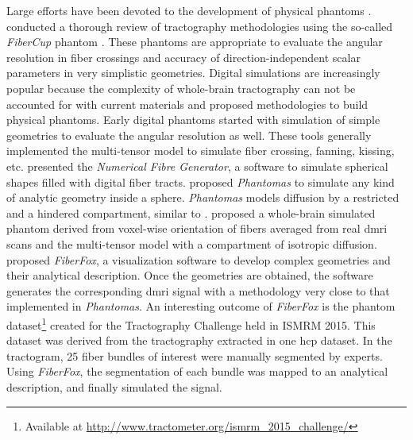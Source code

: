 \documentclass[english]{frontiers/frontiersSCNS} %
\begin{document}
Large efforts have been devoted to the development of physical phantoms
  \citep{lin_validation_2001,campbell_flowbased_2005,perrin_validation_2005,fieremans_simulation_2008,tournier_resolving_2008}.
\cite{cote_tractometer_2013} conducted a thorough review of tractography methodologies using the
  so-called \emph{FiberCup} phantom \citep{poupon_new_2008,fillard_quantitative_2011}.
These phantoms are appropriate to evaluate the angular resolution in fiber crossings and accuracy of
  direction-independent scalar parameters in very simplistic geometries.
Digital simulations are increasingly popular because the complexity of whole-brain tractography
  can not be accounted for with current materials and proposed methodologies to build physical phantoms.
Early digital phantoms started with simulation of simple geometries
  \citep{basser_in_2000,goessl_fiber_2002,tournier_limitations_2002,leemans_mathematical_2005}
  to evaluate the angular resolution as well.
These tools generally implemented the multi-tensor model \citep{alexander_analysis_2001,tuch_high_2002}
  to simulate fiber crossing, fanning, kissing, etc.
\cite{close_software_2009} presented the \emph{Numerical Fibre Generator}, a software to simulate
  spherical shapes filled with digital fiber tracts.
\cite{caruyer_phantomas_2014} proposed \emph{Phantomas} to simulate any kind of analytic geometry
  inside a sphere.
\emph{Phantomas} models diffusion by a restricted and a hindered compartment, similar to
  \citep{assaf_composite_2005}.
\cite{wilkins_fiber_2015} proposed a whole-brain simulated phantom derived from voxel-wise orientation
  of fibers averaged from real \gls*{dmri} scans and the multi-tensor model with a compartment of
  isotropic diffusion.
\cite{neher_fiberfox_2014} proposed \emph{FiberFox}, a visualization software to develop
  complex geometries and their analytical description.
Once the geometries are obtained, the software generates the corresponding \gls*{dmri} signal with a
  methodology very close to that implemented in \emph{Phantomas}.
An interesting outcome of \emph{FiberFox} is the phantom dataset\footnote{Available at
  \url{http://www.tractometer.org/ismrm_2015_challenge/}} created for the Tractography
  Challenge held in ISMRM 2015.
This dataset was derived from the tractography extracted in one \gls*{hcp} dataset.
In the tractogram, 25 fiber bundles of interest were manually segmented by experts.
Using \emph{FiberFox}, the segmentation of each bundle was mapped to an analytical
  description, and finally simulated the signal.
\end{document}
